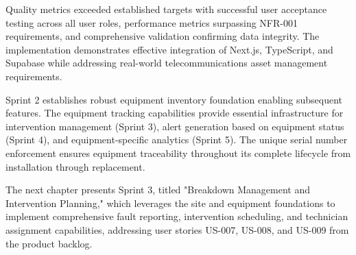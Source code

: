 Quality metrics exceeded established targets with successful user acceptance testing across all user roles, performance metrics surpassing NFR-001 requirements, and comprehensive validation confirming data integrity. The implementation demonstrates effective integration of Next.js, TypeScript, and Supabase while addressing real-world telecommunications asset management requirements.

Sprint 2 establishes robust equipment inventory foundation enabling subsequent features. The equipment tracking capabilities provide essential infrastructure for intervention management (Sprint 3), alert generation based on equipment status (Sprint 4), and equipment-specific analytics (Sprint 5). The unique serial number enforcement ensures equipment traceability throughout its complete lifecycle from installation through replacement.

The next chapter presents Sprint 3, titled "Breakdown Management and Intervention Planning," which leverages the site and equipment foundations to implement comprehensive fault reporting, intervention scheduling, and technician assignment capabilities, addressing user stories US-007, US-008, and US-009 from the product backlog.